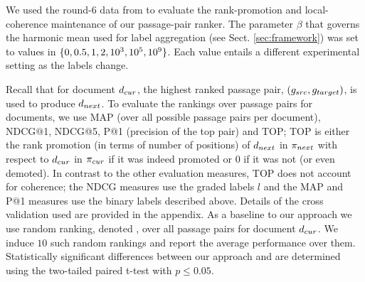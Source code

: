  We used the round-6 data from
\citet{Raifer+al:17a} to evaluate the rank-promotion and
local-coherence maintenance of our passage-pair ranker. The parameter $\beta$ that governs the harmonic mean used for label
aggregation (see Sect. \ref{sec:framework}) was set to values in
$\{0,0.5,1,2,10^3,10^5,10^9\}$. Each value entails a
different experimental setting as the labels change.


Recall that
for document $d_{cur}$, the highest ranked passage pair,
$(g_{src},g_{target})$, is used to produce $d_{next}$. To evaluate the
rankings over passage pairs for documents, we use MAP (over all
possible passage pairs per document), NDCG@1, NDCG@5, P@1 (precision
of the top pair) and TOP; TOP is either the rank promotion (in
terms of number of positions) of $d_{next}$ in $\pi_{next}$ with respect
to $d_{cur}$ in $\pi_{cur}$ if it was indeed promoted or $0$ if it was not (or even demoted). In contrast to the other evaluation measures, TOP does not account for coherence; the NDCG measures use the graded
labels $l$ and the MAP and P@1 measures use the binary labels described
above. Details of the cross validation used are provided in the appendix.
As a baseline to our approach we use random
ranking, denoted \firstmention{\random}, over all passage pairs for
document $d_{cur}$. We induce $10$ such random rankings and report the average performance over them. Statistically significant differences between our
approach and \random are determined using the two-tailed paired t-test with $p \le 0.05$.




